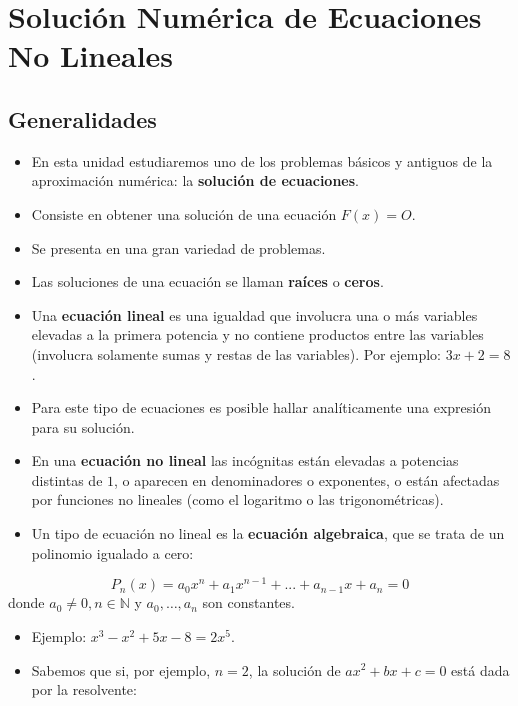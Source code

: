 \documentclass[openany]{book}
\begin{document}
\hypertarget{soluciuxf3n-numuxe9rica-de-ecuaciones-no-lineales}{%
\chapter{Solución Numérica de Ecuaciones No Lineales}\label{soluciuxf3n-numuxe9rica-de-ecuaciones-no-lineales}}

\hypertarget{generalidades}{%
\section{Generalidades}\label{generalidades}}

\begin{itemize}
\item
  En esta unidad estudiaremos uno de los problemas básicos y antiguos de la aproximación numérica: la \textbf{solución de ecuaciones}.
\item
  Consiste en obtener una solución de una ecuación \(F(x) = O\).
\item
  Se presenta en una gran variedad de problemas.
\item
  Las soluciones de una ecuación se llaman \textbf{raíces} o \textbf{ceros}.
\item
  Una \textbf{ecuación lineal} es una igualdad que involucra una o más variables elevadas a la primera potencia y no contiene productos entre las variables (involucra solamente sumas y restas de las variables). Por ejemplo: \(3x+2 = 8\).
\item
  Para este tipo de ecuaciones es posible hallar analíticamente una expresión para su solución.
\item
  En una \textbf{ecuación no lineal} las incógnitas están elevadas a potencias distintas de \(1\), o aparecen en denominadores o exponentes, o están afectadas por funciones no lineales (como el logaritmo o las trigonométricas).
\item
  Un tipo de ecuación no lineal es la \textbf{ecuación algebraica}, que se trata de un polinomio igualado a cero:
\end{itemize}

\[
P_n(x) = a_0 x^n + a_1 x^{n-1} + ... + a_{n-1} x + a_n = 0
\]
donde \(a_0 \ne 0, n \in \mathbb{N}\) y \(a_0, \dots, a_n\) son constantes.

\begin{itemize}
\item
  Ejemplo: \(x^3 - x^2 + 5x - 8 = 2x^5\).
\item
  Sabemos que si, por ejemplo, \(n = 2\), la solución de \(ax^2 + b x + c = 0\) está dada por la resolvente:
\end{itemize}
\end{document}
